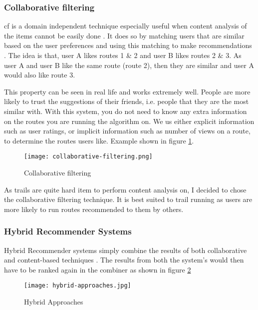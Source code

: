 \subsubsection{Collaborative filtering}
\acrfull{cf} is a domain independent technique especially useful when content analysis of the items cannot be easily done \cite{isinkaye2015recommendation}. It does so by matching users that are similar based on the user preferences and using this matching to make recommendations \cite{herlocker2004evaluating}. The idea is that, user A likes routes 1 \& 2 and user B likes routes 2 \& 3. As user A and user B like the same route (route 2), then they are similar and user A would also like route 3. 

This property can be seen in real life and works extremely well. People are more likely to trust the suggestions of their friends, i.e. people that they are the most similar with. With this system, you do not need to know any extra information on the routes you are running the algorithm on. We us either explicit information such as user ratings, or implicit information such as number of views on a route, to determine the routes users like. Example shown in figure \ref{fig:collaborativeFiltering}.

\begin{figure}[htb!]
    \centering
    \texttt{[image: collaborative-filtering.png]}
    \caption{Collaborative filtering \cite{collabFiltering}}
    \label{fig:collaborativeFiltering}
\end{figure}

As trails are quite hard item to perform content analysis on, I decided to chose the collaborative filtering technique. It is best suited to trail running as users are more likely to run routes recommended to them by others.

\subsubsection{Hybrid Recommender Systems}
Hybrid Recommender systems simply combine the results of both collaborative and content-based techniques \cite{claypool1999combing}. The results from both the system's would then have to be ranked again in the combiner as shown in figure \ref{fig:hybridRecommenderSystems}

\begin{figure}[htb!]
    \centering
    \texttt{[image: hybrid-approaches.jpg]}
    \caption{Hybrid Approaches \cite{hybridrecommender}}
    \label{fig:hybridRecommenderSystems}
\end{figure}

